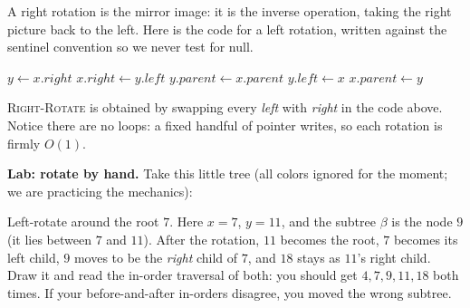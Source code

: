 A right rotation is the mirror image: it is the inverse operation, taking the
right picture back to the left. Here is the code for a left rotation, written
against the sentinel convention so we never test for null.

\begin{algorithm}[H]
\caption{\textsc{Left-Rotate}$(T, x)$}
$y \gets x.\mathit{right}$\;
$x.\mathit{right} \gets y.\mathit{left}$ 
$y.\mathit{parent} \gets x.\mathit{parent}$ 
$y.\mathit{left} \gets x$ 
$x.\mathit{parent} \gets y$\;
\end{algorithm}

\textsc{Right-Rotate} is obtained by swapping every \emph{left} with \emph{right}
in the code above. Notice there are no loops: a fixed handful of pointer writes,
so each rotation is firmly $O(1)$.

\begin{labbox}
\textbf{Lab: rotate by hand.} Take this little tree (all colors ignored for the
moment; we are practicing the mechanics):
\begin{center}
\end{center}
Left-rotate around the root $7$. Here $x = 7$, $y = 11$, and the subtree $\beta$ is
the node $9$ (it lies between $7$ and $11$). After the rotation, $11$ becomes the
root, $7$ becomes its left child, $9$ moves to be the \emph{right} child of $7$,
and $18$ stays as $11$'s right child. Draw it and read the in-order traversal of
both: you should get $4, 7, 9, 11, 18$ both times. If your before-and-after
in-orders disagree, you moved the wrong subtree.
\end{labbox}

